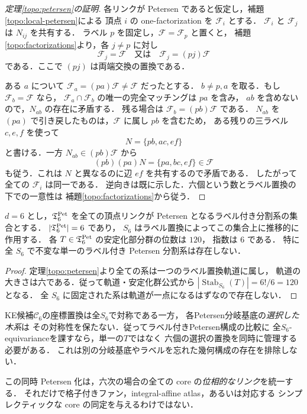 \begin{proof}[定理\ref{topo:petersen}の証明]
各リンクが Petersen であると仮定し，補題\ref{topo:local-petersen}による
頂点 $i$ の one-factorization を $\mathcal F_i$ とする．
$\mathcal F_i$ と $\mathcal F_j$ は $N_{ij}$ を共有する．
ラベル $p$ を固定し，$\mathcal F=\mathcal F_p$ と置くと，
補題\ref{topo:factorizations}より，各 $j\ne p$ に対し
\[
 \mathcal F_j=\mathcal F\quad\text{又は}\quad
 \mathcal F_j=(pj)\mathcal F
\]
である．ここで $(pj)$ は両端交換の置換である．

ある $a$ について $\mathcal F_a=(pa)\mathcal F\ne\mathcal F$ だったとする．
$b\ne p,a$ を取る．もし $\mathcal F_b=\mathcal F$ なら，
$\mathcal F_a\cap\mathcal F_b$ の唯一の完全マッチングは $pa$ を含み，
$ab$ を含めないので，$N_{ab}$ の存在に矛盾する．
残る場合は $\mathcal F_b=(pb)\mathcal F$ である．
$N_{ab}$ を $(pa)$ で引き戻したものは，$\mathcal F$ に属し $pb$ を含むため，
ある残りの三ラベル $c,e,f$ を使って
\[
 N=\{pb,ac,ef\}
\]
と書ける．一方 $N_{ab}\in(pb)\mathcal F$ から
\[
 (pb)(pa)N=\{pa,bc,ef\}\in\mathcal F
\]
も従う．これは $N$ と異なるのに辺 $ef$ を共有するので矛盾である．
したがって全ての $\mathcal F_i$ は同一である．
逆向きは既に示した．六個という数とラベル置換の下での一意性は
補題\ref{topo:factorizations}から従う．
\end{proof}

\begin{corollary}
\label{topo:petersen-symmetry}
$d=6$ とし，$\mathfrak T_6^{\rm Pet}$ を全ての頂点リンクが
Petersen となるラベル付き分割系の集合とする．
$|\mathfrak T_6^{\rm Pet}|=6$ であり，
$S_6$ はラベル置換によってこの集合上に推移的に作用する．
各 $T\in\mathfrak T_6^{\rm Pet}$ の安定化部分群の位数は $120$，
指数は $6$ である．
特に全 $S_6$ で不変な単一のラベル付き Petersen 分割系は存在しない．
\end{corollary}
\begin{proof}
定理\ref{topo:petersen}より全ての系は一つのラベル置換軌道に属し，
軌道の大きさは六である．従って軌道・安定化群公式から
$|\operatorname{Stab}_{S_6}(T)|=6!/6=120$ となる．
全 $S_6$ に固定された系は軌道が一点になるはずなので存在しない．
\end{proof}

\begin{remark}
KE候補$\mathcal C_6$の座標置換は全$S_6$で対称である一方，
各Petersen分岐基底の\emph{選択した木系}は
その対称性を保たない．従ってラベル付きPetersen構成の比較に
全$S_6$-equivarianceを課すなら，単一の$T$ではなく
六個の選択の置換を同時に管理する必要がある．
これは別の分岐基底やラベルを忘れた幾何構成の存在を排除しない．
\end{remark}

この同時 Petersen 化は，六次の場合の全ての core の\emph{位相的なリンク}を統一する．
それだけで格子付きファン，integral-affine atlas，あるいは対応する
シンプレクティックな core の同定を与えるわけではない．

